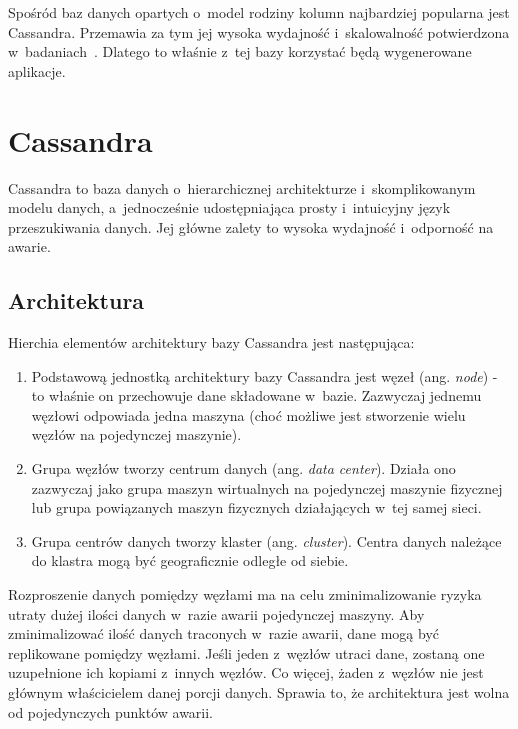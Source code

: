 Spośród baz danych opartych o~model rodziny kolumn najbardziej popularna jest Cassandra.
Przemawia za tym jej wysoka wydajność i~skalowalność potwierdzona w~badaniach~\cite{cassandra_perf}.
Dlatego to właśnie z~tej bazy korzystać będą wygenerowane aplikacje.



\section{Cassandra}

Cassandra to baza danych o~hierarchicznej architekturze i~skomplikowanym modelu danych, a~jednocześnie udostępniająca prosty i~intuicyjny język przeszukiwania danych.
Jej główne zalety to wysoka wydajność i~odporność na awarie.


\subsection{Architektura}

Hierchia elementów architektury bazy Cassandra jest następująca:

\begin{enumerate}
 \item Podstawową jednostką architektury bazy Cassandra jest węzeł (ang. \emph{node}) - to właśnie on przechowuje dane składowane w~bazie.
 Zazwyczaj jednemu węzłowi odpowiada jedna maszyna (choć możliwe jest stworzenie wielu węzłów na pojedynczej maszynie).
 \item Grupa węzłów tworzy centrum danych (ang. \emph{data center}).
 Działa ono zazwyczaj jako grupa maszyn wirtualnych na pojedynczej maszynie fizycznej lub grupa powiązanych maszyn fizycznych działających w~tej samej sieci.
 \item Grupa centrów danych tworzy klaster (ang. \emph{cluster}).
 Centra danych należące do klastra mogą być geograficznie odległe od siebie.
\end{enumerate}

Rozproszenie danych pomiędzy węzłami ma na celu zminimalizowanie ryzyka utraty dużej ilości danych w~razie awarii pojedynczej maszyny.
Aby zminimalizować ilość danych traconych w~razie awarii, dane mogą być replikowane pomiędzy węzłami.
Jeśli jeden z~węzłów utraci dane, zostaną one uzupełnione ich kopiami z~innych węzłów.
Co więcej, żaden z~węzłów nie jest głównym właścicielem danej porcji danych.
Sprawia to, że architektura jest wolna od pojedynczych punktów awarii.

